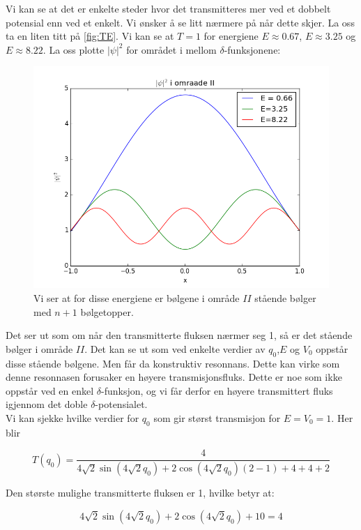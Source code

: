 \documentclass[a4paper,norsk, 10pt]{article}
\numberwithin{equation}{section}
\begin{document}
Vi kan se at det er enkelte steder hvor det transmitteres mer ved et dobbelt potensial enn ved et enkelt. Vi ønsker å se litt nærmere på når dette skjer. La oss ta en liten titt på \ref{fig:TE}. Vi kan se at $T = 1$ for energiene $E \approx 0.67$, $E \approx 3.25$ og $E \approx 8.22$. La oss plotte $|\psi|^2$ for området i mellom $\delta$-funksjonene:

\begin{figure}[H]
\centering
\includegraphics[scale=0.5]{psi2omr2.png}
\caption{Vi ser at for disse energiene er bølgene i område $II$ stående bølger med $n+1$ bølgetopper.}
\end{figure}

Det ser ut som om når den transmitterte fluksen nærmer seg 1, så er det stående bølger i område $II$. Det kan se ut som ved enkelte verdier av $q_0$,$E$ og $V_0$ oppstår disse stående bølgene. Men får da konstruktiv resonnans. Dette kan virke som denne resonnasen forusaker en høyere transmisjonsfluks. Dette er noe som ikke oppstår ved en enkel $\delta$-funksjon, og vi får derfor en høyere transmittert fluks igjennom det doble $\delta$-potensialet.\\


Vi kan sjekke hvilke verdier for $q_0$ som gir størst transmisjon for $E = V_0 = 1$. Her blir

$$
T(q_0) = \frac{4}{4\sqrt{2}\sin(4\sqrt{2} q_0) + 2\cos(4\sqrt{2} q_0)(2 - 1)+4 +4 + 2}
$$

Den største mulighe transmitterte fluksen er 1, hvilke betyr at:

$$
4\sqrt{2}\sin(4\sqrt{2} q_0) + 2\cos(4\sqrt{2} q_0)+10 = 4
$$
\end{document}
